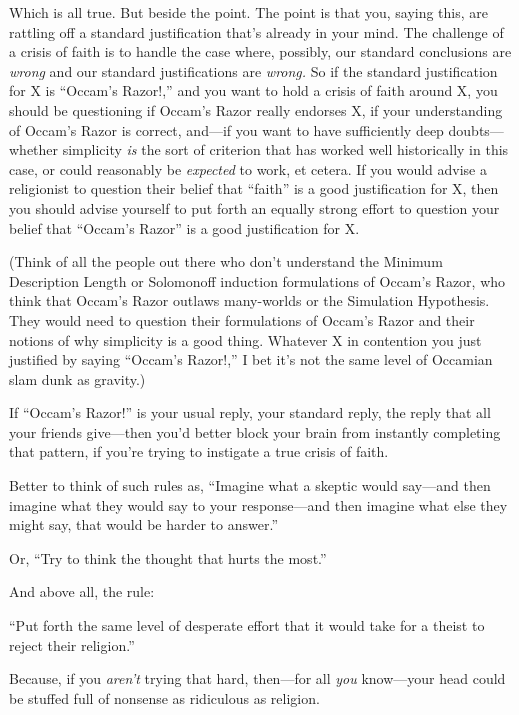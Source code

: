 {
 Which is all true. But beside the point. The point is that you,
saying this, are rattling off a standard justification
that's already in your mind. The challenge of a crisis
of faith is to handle the case where, possibly, our standard
conclusions are \textit{wrong} and our standard justifications are
\textit{wrong.} So if the standard justification for X is
``Occam's Razor!,''
and you want to hold a crisis of faith around X, you should be
questioning if Occam's Razor really endorses X, if your
understanding of Occam's Razor is correct, and---if you
want to have sufficiently deep doubts---whether simplicity \textit{is}
the sort of criterion that has worked well historically in this case,
or could reasonably be \textit{expected} to work, et cetera. If you
would advise a religionist to question their belief that
``faith'' is a good justification
for X, then you should advise yourself to put forth an equally strong
effort to question your belief that
``Occam's Razor'' is
a good justification for X.}

{
 (Think of all the people out there who don't
understand the Minimum Description Length or Solomonoff induction
formulations of Occam's Razor, who think that
Occam's Razor outlaws many-worlds or the Simulation
Hypothesis. They would need to question their formulations of
Occam's Razor and their notions of why simplicity is a
good thing. Whatever X in contention you just justified by saying
``Occam's Razor!,''
I bet it's not the same level of Occamian slam dunk as
gravity.)}

{
 If ``Occam's
Razor!'' is your usual reply, your standard reply,
the reply that all your friends give---then you'd
better block your brain from instantly completing that pattern, if
you're trying to instigate a true crisis of faith.}

{
 Better to think of such rules as, ``Imagine what
a skeptic would say---and then imagine what they would say to your
response---and then imagine what else they might say, that would be
harder to answer.''}

{
 Or, ``Try to think the thought that hurts the
most.''}

{
 And above all, the rule:}

{
 ``Put forth the same level of desperate effort
that it would take for a theist to reject their
religion.''}

{
 Because, if you \textit{aren't} trying that hard,
then---for all \textit{you} know---your head could be stuffed full of
nonsense as ridiculous as religion.}

